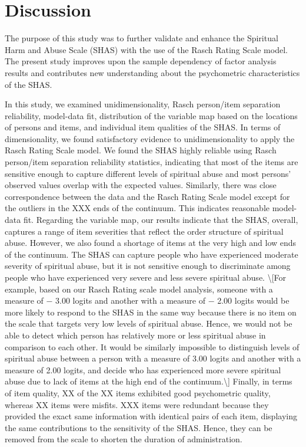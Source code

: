 \documentclass[
  letterpaper,
]{article}
\begin{document}

\chapter*{Discussion}\label{discussion}


The purpose of this study was to further validate and enhance the
Spiritual Harm and Abuse Scale (SHAS) with the use of the Rasch Rating
Scale model. The present study improves upon the sample dependency of
factor analysis results and contributes new understanding about the
psychometric characteristics of the SHAS.

In this study, we examined unidimensionality, Rasch person/item
separation reliability, model-data fit, distribution of the variable map
based on the locations of persons and items, and individual item
qualities of the SHAS. In terms of dimensionality, we found satisfactory
evidence to unidimensionality to apply the Rasch Rating Scale model. We
found the SHAS highly reliable using Rasch person/item separation
reliability statistics, indicating that most of the items are sensitive
enough to capture different levels of spiritual abuse and most persons'
observed values overlap with the expected values. Similarly, there was
close correspondence between the data and the Rasch Rating Scale model
except for the outliers in the XXX ends of the continuum. This indicates
reasonable model-data fit. Regarding the variable map, our results
indicate that the SHAS, overall, captures a range of item severities
that reflect the order structure of spiritual abuse. However, we also
found a shortage of items at the very high and low ends of the
continuum. The SHAS can capture people who have experienced moderate
severity of spiritual abuse, but it is not sensitive enough to
discriminate among people who have experienced very severe and less
severe spiritual abuse. \textbackslash{[}For example, based on our Rasch
Rating scale model analysis, someone with a measure of − 3.00 logits and
another with a measure of − 2.00 logits would be more likely to respond
to the SHAS in the same way because there is no item on the scale that
targets very low levels of spiritual abuse. Hence, we would not be able
to detect which person has relatively more or less spiritual abuse in
comparison to each other. It would be similarly impossible to
distinguish levels of spiritual abuse between a person with a measure of
3.00 logits and another with a measure of 2.00 logits, and decide who
has experienced more severe spiritual abuse due to lack of items at the
high end of the continuum.\textbackslash{]} Finally, in terms of item
quality, XX of the XX items exhibited good psychometric quality, whereas
XX items were misfits. XXX items were redundant because they provided
the exact same information with identical pairs of each item, displaying
the same contributions to the sensitivity of the SHAS. Hence, they can
be removed from the scale to shorten the duration of administration.
\end{document}
